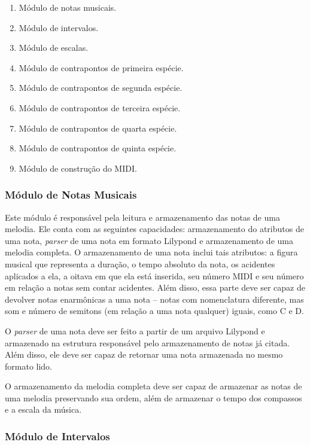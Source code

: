     \begin{enumerate}
      \item Módulo de notas musicais.
      \item Módulo de intervalos.
      \item Módulo de escalas.
      \item Módulo de contrapontos de primeira espécie.
      \item Módulo de contrapontos de segunda espécie.
      \item Módulo de contrapontos de terceira espécie.
      \item Módulo de contrapontos de quarta espécie.
      \item Módulo de contrapontos de quinta espécie.
      \item Módulo de construção do MIDI.
    \end{enumerate}

    \subsubsection[Módulo de Notas Musicais]{Módulo de Notas Musicais}

      Este módulo é responsável pela leitura e armazenamento das notas de uma melodia. Ele conta com as seguintes capacidades: armazenamento do atributos de uma nota, \textit{parser} de uma nota em formato Lilypond e armazenamento de uma melodia completa. O armazenamento de uma nota inclui tais atributos: a figura musical que representa a duração, o tempo absoluto da nota, os acidentes aplicados a ela, a oitava em que ela está inserida, seu número MIDI e seu número em relação a notas sem contar acidentes. Além disso, essa parte deve ser capaz de devolver notas enarmônicas a uma nota -- notas com nomenclatura diferente, mas som e número de semitons (em relação a uma nota qualquer) iguais, como C\sh{}  e D\fl.

      O \textit{parser} de uma nota deve ser feito a partir de um arquivo Lilypond e armazenado na estrutura responsável pelo armazenamento de notas já citada. Além disso, ele deve ser capaz de retornar uma nota armazenada no mesmo formato lido.

      O armazenamento da melodia completa deve ser capaz de armazenar as notas de uma melodia preservando sua ordem, além de armazenar o tempo dos compassos e a escala da música.

    \subsubsection[Módulo de Intervalos]{Módulo de Intervalos}

